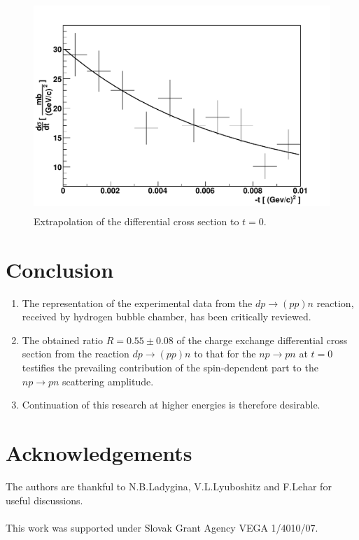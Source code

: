 \documentclass[a4paper,12pt]{article}
\begin{document}
\begin{figure}[!htp]
  \begin{center}
    \includegraphics[angle=0,height=8cm]{fig_2p.pdf}
    \caption {Extrapolation of the differential cross section to $t = 0$.}
    \label{f_2p}
  \end{center}
\end{figure}

\section {Conclusion}
\begin{enumerate}
\item{ The representation of the experimental data from the $dp\to(p p)n$
  reaction, received by hydrogen bubble chamber, has been critically reviewed.}
\item{ The obtained ratio $R = 0.55\pm 0.08$ of the charge exchange differential
  cross section from the reaction $dp\to(pp)n$  to  that for the $n p\to p n$ at
  $t = 0$ testifies the prevailing contribution of the spin-dependent part to
  the $n p\to pn$ scattering amplitude.}
\item{Continuation of this research at higher energies is therefore desirable.}
\end{enumerate}

\section {Acknowledgements}
The authors are thankful to N.B.Ladygina, V.L.Lyuboshitz and F.Lehar for useful
discussions.
\\ \\
This work was supported under Slovak Grant Agency VEGA 1/4010/07.
\end{document}
